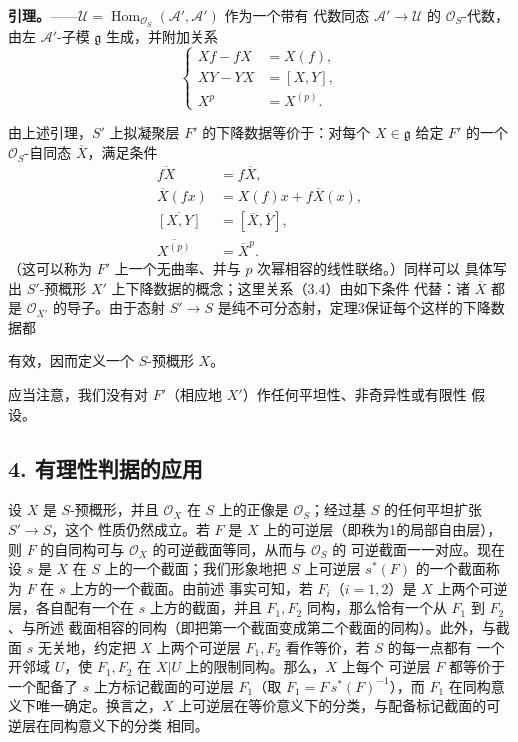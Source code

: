 \textbf{引理。}——$\mathcal U=
\operatorname{Hom}_{\mathcal O_S}(\mathcal A',\mathcal A')$ 作为一个带有
代数同态 $\mathcal A'\longrightarrow\mathcal U$ 的 $\mathcal O_S$-代数，
由左 $\mathcal A'$-子模 $\mathfrak g$ 生成，并附加关系
\begin{equation}
  \left\{
  \begin{aligned}
    Xf-fX&=X(f),\\
    XY-YX&=[X,Y],\\
    X^p&=X^{(p)}.
  \end{aligned}
  \right.
  \tag{3.6}
\end{equation}

由上述引理，$S'$ 上拟凝聚层 $F'$ 的下降数据等价于：对每个
$X\in\mathfrak g$ 给定 $F'$ 的一个 $\mathcal O_S$-自同态
$\overline X$，满足条件
\begin{align}
  \overline{fX}&=f\overline X, \tag{3.7}\\
  \overline X(fx)&=X(f)x+f\overline X(x), \tag{3.8}\\
  \overline{[X,Y]}&=[\overline X,\overline Y], \tag{3.9}\\
  \overline{X^{(p)}}&=\overline X^p. \tag{3.10}
\end{align}
（这可以称为 $F'$ 上一个无曲率、并与 $p$ 次幂相容的线性联络。）同样可以
具体写出 $S'$-预概形 $X'$ 上下降数据的概念；这里关系（3.4）由如下条件
代替：诸 $\overline X$ 都是 $\mathcal O_{X'}$ 的导子。由于态射
$S'\longrightarrow S$ 是纯不可分态射，定理3保证每个这样的下降数据都

有效，因而定义一个 $S$-预概形 $X$。

应当注意，我们没有对 $F'$（相应地 $X'$）作任何平坦性、非奇异性或有限性
假设。

\subsection*{4. 有理性判据的应用}

设 $X$ 是 $S$-预概形，并且 $\mathcal O_X$ 在 $S$ 上的正像是
$\mathcal O_S$；经过基 $S$ 的任何平坦扩张 $S'\longrightarrow S$，这个
性质仍然成立。若 $F$ 是 $X$ 上的可逆层（即秩为1的局部自由层），则 $F$
的自同构可与 $\mathcal O_X$ 的可逆截面等同，从而与 $\mathcal O_S$ 的
可逆截面一一对应。现在设 $s$ 是 $X$ 在 $S$ 上的一个截面；我们形象地把
$S$ 上可逆层 $s^*(F)$ 的一个截面称为 $F$ 在 $s$ 上方的一个截面。由前述
事实可知，若 $F_i$（$i=1,2$）是 $X$ 上两个可逆层，各自配有一个在 $s$
上方的截面，并且 $F_1,F_2$ 同构，那么恰有一个从 $F_1$ 到 $F_2$、与所述
截面相容的同构（即把第一个截面变成第二个截面的同构）。此外，与截面 $s$
无关地，约定把 $X$ 上两个可逆层 $F_1,F_2$ 看作等价，若 $S$ 的每一点都有
一个开邻域 $U$，使 $F_1,F_2$ 在 $X|U$ 上的限制同构。那么，$X$ 上每个
可逆层 $F$ 都等价于一个配备了 $s$ 上方标记截面的可逆层 $F_1$（取
$F_1=F\,s^*(F)^{-1}$），而 $F_1$ 在同构意义下唯一确定。换言之，$X$
上可逆层在等价意义下的分类，与配备标记截面的可逆层在同构意义下的分类
相同。

